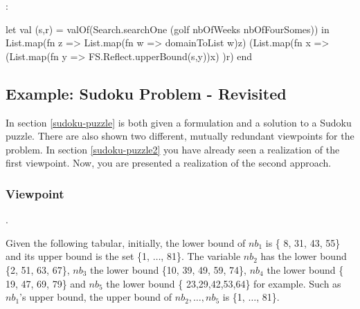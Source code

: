 \documentclass[a4paper]{scrartcl}
\begin{document}
:
\begin{myverbatim}
let 
    val (s,r) = valOf(Search.searchOne
                  (golf nbOfWeeks nbOfFourSomes))
in
    List.map(fn z =>
     List.map(fn w => domainToList w)z)
         (List.map(fn x => 
             (List.map(fn y => 
               FS.Reflect.upperBound(s,y))x)
         )r)
end
\end{myverbatim}



\newpage

\subsection{Example: Sudoku Problem - Revisited}
\label{sudoku-puzzle3}
In section \ref{sudoku-puzzle} is both given a formulation
and a solution to a Sudoku puzzle. There are also shown
two different, mutually redundant viewpoints for the problem.
In section \ref{sudoku-puzzle2} you have already seen a
realization of the first viewpoint. Now, you are presented
a realization of the second approach.

\subsubsection{Viewpoint}
.

Given the following tabular, initially, the lower bound of $nb_1$ is
\{ 8, 31, 43, 55\} and its upper bound is the set \{1, $\ldots$, 81\}. The variable
$nb_2$ has the lower bound \{2, 51, 63, 67\}, $nb_3$ the lower bound 
\{10, 39, 49, 59, 74\}, $nb_4$ the lower bound \{ 19, 47, 69, 79\} and 
$nb_5$ the lower bound \{ 23,29,42,53,64\} for example. Such as $nb_1$'s upper
bound, the upper bound of $nb_2, \ldots, nb_5$ is \{1, $\ldots$, 81\}.
\end{document}
